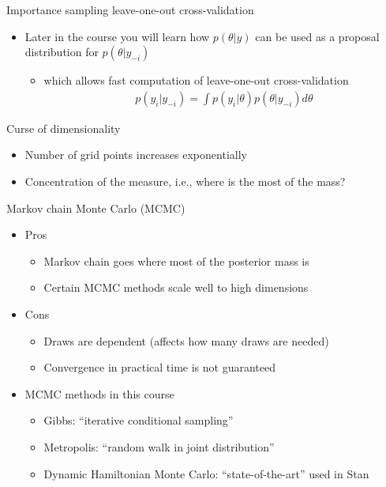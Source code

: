 \documentclass[english,t]{beamer}
\begin{document}
\begin{frame}{Importance sampling leave-one-out cross-validation}

  \begin{itemize}
  \item Later in the course you will learn how $p(\theta|y)$ can be
    used as a proposal distribution for $p(\theta|y_{-i})$
    \begin{itemize}
    \item which allows fast computation of leave-one-out cross-validation
      \begin{align*}
        p(y_i|y_{-i})=\int p(y_i|\theta) p(\theta|y_{-i}) d\theta
      \end{align*}
    \end{itemize}
  \end{itemize}

\end{frame}

\begin{frame}{Curse of dimensionality}

  \begin{itemize}
  \item Number of grid points increases exponentially
  \item Concentration of the measure, i.e., where is the most of the
    mass?
  \end{itemize}

\end{frame}

\begin{frame}{Markov chain Monte Carlo (MCMC)}

  \begin{itemize}
  \item Pros
    \begin{itemize}
    \item Markov chain goes where most of the posterior mass is
    \item Certain MCMC methods scale well to high dimensions
    \end{itemize}
  \item Cons
    \begin{itemize}
    \item Draws are dependent (affects how many draws are needed)
    \item Convergence in practical time is not guaranteed
    \end{itemize}
  \item MCMC methods in this course
    \begin{itemize}
    \item Gibbs: ``iterative conditional sampling''
    \item Metropolis: ``random walk in joint distribution''
    \item Dynamic Hamiltonian Monte Carlo: ``state-of-the-art'' used in Stan
    \end{itemize}
  \end{itemize}

\end{frame}
\end{document}
